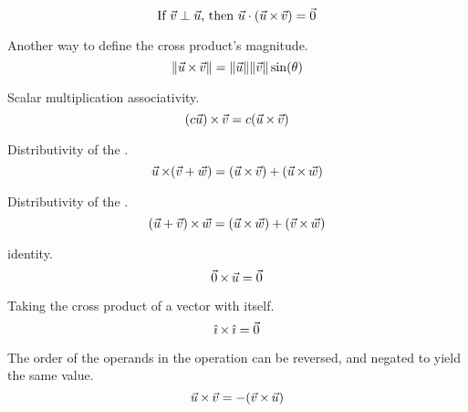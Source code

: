 \begin{propertylist}
\item
  \begin{equation*}
    \text{If } \vec{v} \perp \vec{u} \text{, then } \vec{u} \cdot (\vec{u} \operatorname{\times} \vec{v}) = \vec{0}
  \end{equation*}
\item Another way to define the cross product's magnitude.
  \begin{equation*}
    \lVert \vec{u} \operatorname{\times} \vec{v} \rVert = \lVert \vec{u} \rVert \lVert \vec{v} \rVert \sin(\theta)
  \end{equation*}
\item Scalar multiplication associativity.
  \begin{equation*}
    (c \vec{u}) \operatorname{\times} \vec{v} = c(\vec{u} \operatorname{\times} \vec{v})
  \end{equation*}
\item Distributivity of the .
  \begin{equation*}
    \vec{u} \operatorname{\times} (\vec{v} + \vec{w}) = (\vec{u} \operatorname{\times} \vec{v}) + (\vec{u} \operatorname{\times} \vec{w})
  \end{equation*}
\item Distributivity of the .
  \begin{equation*}
    (\vec{u} + \vec{v}) \operatorname{\times} \vec{w} = (\vec{u} \operatorname{\times} \vec{w}) + (\vec{v} \operatorname{\times} \vec{w})
  \end{equation*}
\item {} identity.
  \begin{equation*}
    \vec{0} \operatorname{\times} \vec{u} = \vec{0}
  \end{equation*}
\item Taking the cross product of a vector with itself.
  \begin{equation*}
    \hat{\imath} \operatorname{\times} \hat{\imath} = \vec{0}
  \end{equation*}
\item The order of the operands in the  operation can be reversed, and negated to yield the same value.
  \begin{equation*}
    \vec{u} \operatorname{\times} \vec{v} = -(\vec{v} \operatorname{\times} \vec{u})
  \end{equation*}
\end{propertylist}

